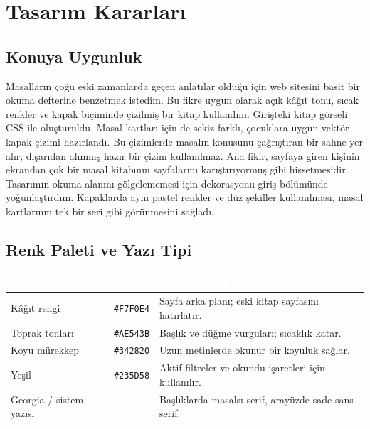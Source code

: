 \documentclass[12pt,a4paper]{article}
\begin{document}
\section{Tasarım Kararları}
\subsection{Konuya Uygunluk}
Masalların çoğu eski zamanlarda geçen anlatılar olduğu için web sitesini basit bir okuma defterine benzetmek istedim. Bu fikre uygun olarak açık kâğıt tonu, sıcak renkler ve kapak biçiminde çizilmiş bir kitap kullandım. Girişteki kitap görseli CSS ile oluşturuldu. Masal kartları için de sekiz farklı, çocuklara uygun vektör kapak çizimi hazırlandı. Bu çizimlerde masalın konusunu çağrıştıran bir sahne yer alır; dışarıdan alınmış hazır bir çizim kullanılmaz. Ana fikir, sayfaya giren kişinin ekrandan çok bir masal kitabının sayfalarını karıştırıyormuş gibi hissetmesidir. Tasarımın okuma alanını gölgelememesi için dekorasyonu giriş bölümünde yoğunlaştırdım. Kapaklarda aynı pastel renkler ve düz şekiller kullanılması, masal kartlarının tek bir seri gibi görünmesini sağladı.

\subsection{Renk Paleti ve Yazı Tipi}
\begin{center}
\begin{tabular}{@{}llp{6.4cm}@{}}
\toprule
\rowcolor{ana}\textcolor{white}{\textbf{Ad}} & \textcolor{white}{\textbf{Kod}} & \textcolor{white}{\textbf{Nerede / neden kullandınız?}} \\
\midrule
Kâğıt rengi & \texttt{\#F7F0E4} & Sayfa arka planı; eski kitap sayfasını hatırlatır. \\
Toprak tonları & \texttt{\#AE543B} & Başlık ve düğme vurguları; sıcaklık katar. \\
Koyu mürekkep & \texttt{\#342820} & Uzun metinlerde okunur bir koyuluk sağlar. \\
Yeşil & \texttt{\#235D58} & Aktif filtreler ve okundu işaretleri için kullanılır. \\
Georgia / sistem yazısı & -- & Başlıklarda masalsı serif, arayüzde sade sans-serif. \\
\bottomrule
\end{tabular}
\end{center}
\end{document}
